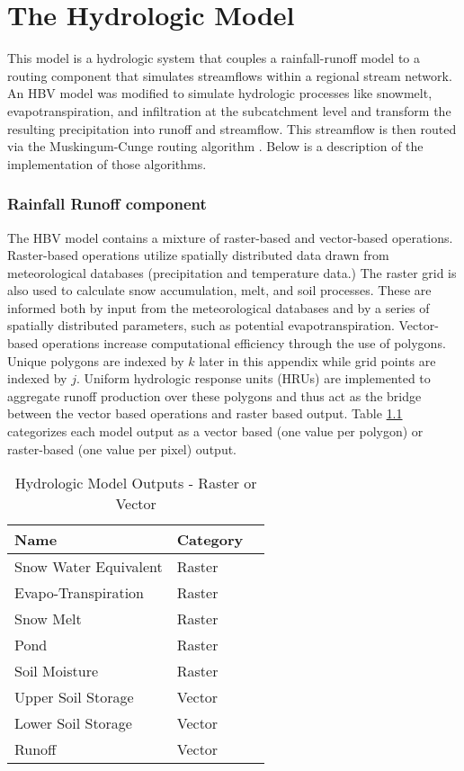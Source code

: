 \chapter{The Hydrologic Model}
\label{chap:daWUAPhydroengine}

This model is a hydrologic system that couples a rainfall-runoff model to a routing component that simulates streamflows within a regional stream network. An HBV model \cite{Bergstrom1992, Bergstrom1976} was modified to simulate hydrologic processes like snowmelt, evapotranspiration, and infiltration at the subcatchment level and transform the resulting precipitation into runoff and streamflow. This streamflow is then routed via the Muskingum-Cunge routing algorithm \cite{V.TChowD.RMaidment1988}. Below is a description of the implementation of those algorithms.

\subsection{Rainfall Runoff component}

The HBV model \cite{Bergstrom1992, Bergstrom1976} contains a mixture of raster-based and vector-based operations. Raster-based operations utilize spatially distributed data drawn from meteorological databases (precipitation and temperature data.)  The raster grid is also used to calculate snow accumulation, melt, and soil processes. These are informed both by input from the meteorological databases and by a series of spatially distributed parameters, such as potential evapotranspiration. Vector-based operations increase computational efficiency through the use of polygons. Unique polygons are indexed by $k$ later in this appendix while grid points are indexed by $j$. Uniform hydrologic response units (HRUs) are implemented to aggregate runoff production over these polygons and thus act as the bridge between the vector based operations and raster based output. Table \ref{tab:t_outputs_raster_or_vector} categorizes each model output as a vector based (one value per polygon) or raster-based (one value per pixel) output.


\begin{table}[]
\caption{Hydrologic Model Outputs - Raster or Vector} 
\begin{tabular}{lll}
Name & Category  \\ \hline
Snow Water Equivalent & Raster \\
Evapo-Transpiration & Raster \\
Snow Melt & Raster \\
Pond & Raster \\
Soil Moisture & Raster \\
Upper Soil Storage & Vector \\
Lower Soil Storage & Vector \\
Runoff & Vector \\
\end{tabular}
\label{tab:t_outputs_raster_or_vector}
\end{table}

